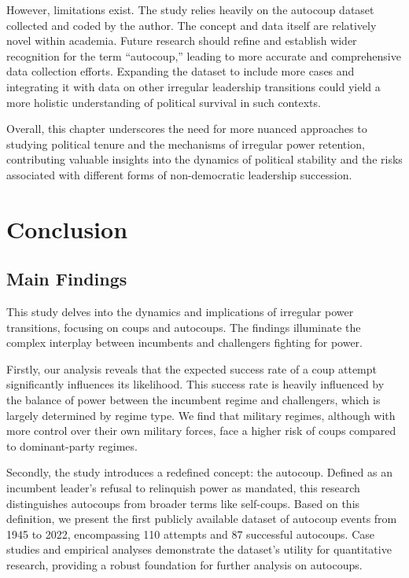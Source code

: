 \documentclass[
  12pt,
]{report}
\begin{document}
However, limitations exist. The study relies heavily on the autocoup
dataset collected and coded by the author. The concept and data itself
are relatively novel within academia. Future research should refine and
establish wider recognition for the term ``autocoup,'' leading to more
accurate and comprehensive data collection efforts. Expanding the
dataset to include more cases and integrating it with data on other
irregular leadership transitions could yield a more holistic
understanding of political survival in such contexts.

Overall, this chapter underscores the need for more nuanced approaches
to studying political tenure and the mechanisms of irregular power
retention, contributing valuable insights into the dynamics of political
stability and the risks associated with different forms of
non-democratic leadership succession.

\chapter{Conclusion}\label{conclusion-3}

\section{Main Findings}\label{main-findings}

This study delves into the dynamics and implications of irregular power
transitions, focusing on coups and autocoups. The findings illuminate
the complex interplay between incumbents and challengers fighting for
power.

Firstly, our analysis reveals that the expected success rate of a coup
attempt significantly influences its likelihood. This success rate is
heavily influenced by the balance of power between the incumbent regime
and challengers, which is largely determined by regime type. We find
that military regimes, although with more control over their own
military forces, face a higher risk of coups compared to dominant-party
regimes.

Secondly, the study introduces a redefined concept: the autocoup.
Defined as an incumbent leader's refusal to relinquish power as
mandated, this research distinguishes autocoups from broader terms like
self-coups. Based on this definition, we present the first publicly
available dataset of autocoup events from 1945 to 2022, encompassing 110
attempts and 87 successful autocoups. Case studies and empirical
analyses demonstrate the dataset's utility for quantitative research,
providing a robust foundation for further analysis on autocoups.
\end{document}
